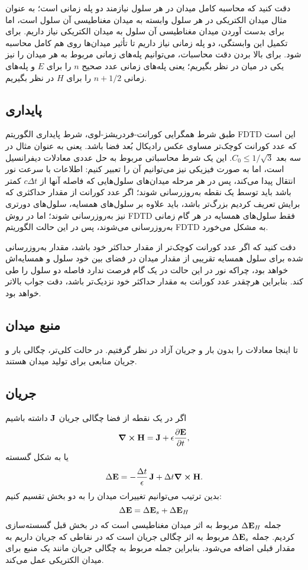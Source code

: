 \documentclass[12pt,a4paper]{article}
\begin{document}
	دقت کنید که محاسبه کامل میدان در هر سلول نیازمند دو پله زمانی است؛ به عنوان مثال میدان الکتریکی در هر سلول وابسته به میدان مغناطیسی آن سلول است،
	اما برای بدست آوردن میدان مغناطیسی آن سلول به میدان الکتریکی نیاز داریم. برای تکمیل این وابستگی،
	دو پله زمانی نیاز داریم تا تأثیر میدان‌ها روی هم کامل محاسبه شود. برای بالا بردن دقت محاسبات،
	می‌توانیم پله‌های زمانی مربوط به هر میدان را نیز یکی در میان در نظر بگیریم؛
	یعنی پله‌های زمانی عدد صحیح $n$ را برای $E$ و پله‌های زمانی $n+1/2 $ را برای $H$ در نظر بگیریم.
	\subsection{پایداری}
	طبق شرط همگرایی کورانت-فردریشز-لوی، شرط پایداری الگوریتم FDTD این است که
	عدد کورانت کوچک‌تر مساوی عکس رادیکال بُعد فضا باشد. یعنی به عنوان مثال در سه بعد $C_0\le1/\sqrt{3}$.
	این یک شرط محاسباتی مربوط به حل عددی معادلات دیفرانسیل است، اما به صورت فیزیکی نیز می‌توانیم آن را تعبیر کنیم:
	اطلاعات با سرعت نور انتقال پیدا می‌کند، پس در هر مرحله میدان‌های سلول‌هایی که فاصله آنها از $c\Delta{t}$ کمتر باشد باید توسط یک نقطه به‌روزرسانی شوند؛
	اگر عدد کورانت از مقدار حداکثری که برایش تعریف کردیم بزرگ‌تر باشد، باید علاوه بر سلول‌های همسایه، سلول‌های دورتری نیز به‌روزرسانی شوند؛
	اما در روش FDTD فقط سلول‌های همسایه در هر گام زمانی به‌روزرسانی می‌شوند، پس در این حالت الگوریتم FDTD به مشکل می‌خورد.
	
	دقت کنید که اگر عدد کورانت کوچک‌تر از مقدار حداکثر خود باشد، مقدار به‌روزرسانی شده برای سلول همسایه تقریبی از مقدار میدان در فضای بین
	خود سلول و همسایه‌اش خواهد بود، چراکه نور در این حالت در یک گام فرصت ندارد فاصله دو سلول را طی کند.
	بنابراین هرچقدر عدد کورانت به مقدار حداکثر خود نزدیک‌تر باشد، دقت جواب بالاتر خواهد بود.
	\subsection{منبع میدان}
	تا اینجا معادلات را بدون بار و جریان آزاد در نظر گرفتیم. در حالت کلی‌تر، چگالی بار و جریان منابعی برای تولید میدان هستند.
	\subsection{جریان}
	اگر در یک نقطه از فضا چگالی جریان $\vb{J}$ داشته باشیم
	\begin{equation}
		\curl{\vb{H}}=\vb{J}+\epsilon\pdv{\vb{E}}{t},
	\end{equation}
	یا به شکل گسسته
	\begin{equation}\label{addj}
		\Delta{\vb{E}}=-\frac{\Delta{t}}{\epsilon}\,\vb{J}+\Delta{t}\curl{\vb{H}}.
	\end{equation}
	بدین ترتیب می‌توانیم تغییرات میدان را به دو بخش تقسیم کنیم:
	\begin{equation}
		\Delta{\vb{E}}=\Delta{\vb{E}}_s + \Delta{\vb{E}}_H
	\end{equation}
	جمله $\Delta{\vb{E}}_H$ مربوط به اثر میدان مغناطیسی است که در بخش قبل گسسته‌سازی کردیم.
	جمله $\Delta{\vb{E}}_s$ مربوط به اثر چگالی جریان است که در نقاطی که جریان داریم به مقدار قبلی اضافه می‌شود.
	بنابراین جمله مربوط به چگالی جریان مانند یک منبع برای میدان الکتریکی عمل می‌کند.
	
\end{document}

